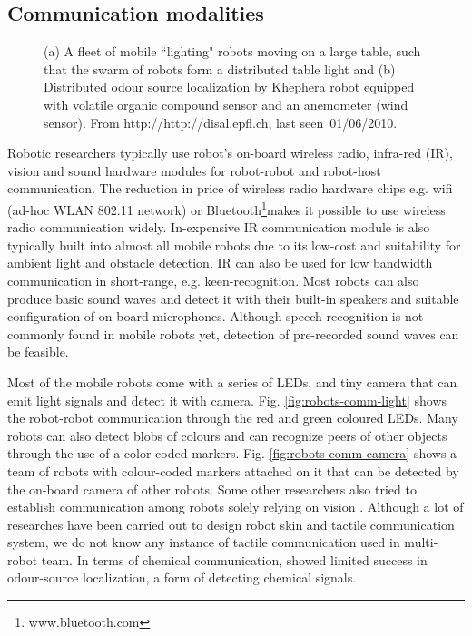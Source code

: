 \subsection{Communication modalities}
\begin{figure}
\centering
{} 
\hspace{0.25cm}
\caption{ (a) A fleet of mobile ``lighting" robots moving on a large table, such that the swarm of robots form a distributed table light and (b) Distributed odour source localization by Khephera robot equipped with volatile organic compound sensor and an anemometer (wind sensor). From http://http://disal.epfl.ch, last seen~01/06/2010.}
\label{fig:epfl-disal}
\end{figure}
Robotic researchers typically use robot's on-board wireless radio, infra-red (IR), vision and sound hardware modules for robot-robot and robot-host communication. The reduction in price of wireless radio hardware chips e.g. wifi (ad-hoc WLAN 802.11 network) or Bluetooth\footnote{www.bluetooth.com}makes it possible to use wireless radio communication widely. In-expensive IR communication module is also typically built into almost all mobile robots due to its low-cost and suitability for ambient light and obstacle detection. IR can also be used for low bandwidth communication in short-range, e.g. keen-recognition. Most robots can also produce basic sound waves and detect it with their built-in speakers and suitable configuration of on-board microphones. Although speech-recognition is not commonly found in mobile robots yet, detection of pre-recorded sound waves can be feasible.

Most of the mobile robots come with a series of LEDs, and tiny camera that can emit light signals and detect it with camera. Fig. \ref{fig:robots-comm-light} shows the robot-robot communication through the red and green coloured LEDs. Many robots can also detect blobs of colours and can recognize peers of other objects through the use of a color-coded markers. Fig. \ref{fig:robots-comm-camera} shows a team of robots with colour-coded markers attached on it that can be detected by the on-board camera of other robots. Some other researchers also tried to establish communication among robots solely relying on vision \cite{Kuniyoshi1994}. Although a lot of researches have been carried out to design robot skin and tactile communication system, we do not know any instance of tactile communication used in multi-robot team. In terms of chemical communication,  showed  limited success in odour-source localization, a form of detecting chemical signals.
